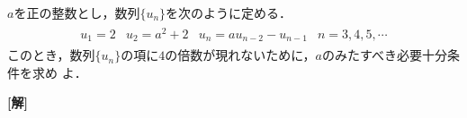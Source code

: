 \documentclass[a4j]{jarticle}
\begin{document}

\preEqlabel{$\cdots$}
     \begin{oframed}
     $a$を正の整数とし，数列$\{u_n\}$を次のように定める．
          \begin{align*}
               \begin{array}{llll}
               u_1=2&u_2=a^2+2&u_n=au_{n-2}-u_{n-1}&n=3,4,5,\cdots
               \end{array}
          \end{align*}
     このとき，数列$\{u_n\}$の項に$4$の倍数が現れないために，$a$のみたすべき必要十分条件を求め
     よ．
     \end{oframed}

\setlength{\columnseprule}{0.4pt}
\begin{multicols}{2}
{\bf[解]} 

\newpage
\end{multicols}
\end{document}
